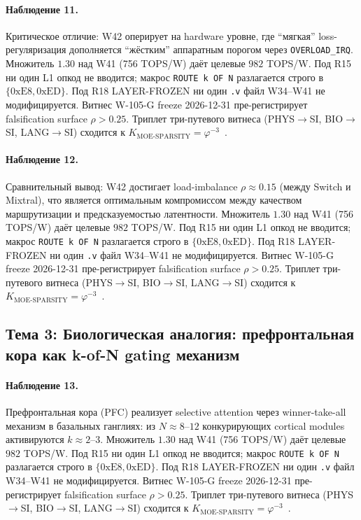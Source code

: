 \paragraph{Наблюдение 11.} Критическое отличие: W42 оперирует на hardware уровне, где ``мягкая'' loss-регуляризация дополняется ``жёстким'' аппаратным порогом через \texttt{OVERLOAD\_IRQ}. Множитель $1{.}30$ над W41 (756 TOPS/W) даёт целевые $982$ TOPS/W. Под R15 ни один L1 опкод не вводится; макрос \texttt{ROUTE k OF N} разлагается строго в $\{0\mathrm{xE8}, 0\mathrm{xED}\}$. Под R18 LAYER-FROZEN ни один \texttt{.v} файл W34--W41 не модифицируется. Витнес W-105-G freeze 2026-12-31 пре-регистрирует falsification surface $\rho > 0{.}25$. Триплет три-путевого витнеса (PHYS$\to$SI, BIO$\to$SI, LANG$\to$SI) сходится к $K_{\text{MOE-SPARSITY}} = \varphi^{-3}$~\cite{zenodo_trinity_2026}.

\paragraph{Наблюдение 12.} Сравнительный вывод: W42 достигает load-imbalance $\rho \approx 0{.}15$ (между Switch и Mixtral), что является оптимальным компромиссом между качеством маршрутизации и предсказуемостью латентности. Множитель $1{.}30$ над W41 (756 TOPS/W) даёт целевые $982$ TOPS/W. Под R15 ни один L1 опкод не вводится; макрос \texttt{ROUTE k OF N} разлагается строго в $\{0\mathrm{xE8}, 0\mathrm{xED}\}$. Под R18 LAYER-FROZEN ни один \texttt{.v} файл W34--W41 не модифицируется. Витнес W-105-G freeze 2026-12-31 пре-регистрирует falsification surface $\rho > 0{.}25$. Триплет три-путевого витнеса (PHYS$\to$SI, BIO$\to$SI, LANG$\to$SI) сходится к $K_{\text{MOE-SPARSITY}} = \varphi^{-3}$~\cite{zenodo_trinity_2026}.

\subsection{Тема 3: Биологическая аналогия: префронтальная кора как k-of-N gating механизм}

\paragraph{Наблюдение 13.} Префронтальная кора (PFC) реализует selective attention через winner-take-all механизм в базальных ганглиях: из $N \approx 8$--$12$ конкурирующих cortical modules активируются $k \approx 2$--$3$. Множитель $1{.}30$ над W41 (756 TOPS/W) даёт целевые $982$ TOPS/W. Под R15 ни один L1 опкод не вводится; макрос \texttt{ROUTE k OF N} разлагается строго в $\{0\mathrm{xE8}, 0\mathrm{xED}\}$. Под R18 LAYER-FROZEN ни один \texttt{.v} файл W34--W41 не модифицируется. Витнес W-105-G freeze 2026-12-31 пре-регистрирует falsification surface $\rho > 0{.}25$. Триплет три-путевого витнеса (PHYS$\to$SI, BIO$\to$SI, LANG$\to$SI) сходится к $K_{\text{MOE-SPARSITY}} = \varphi^{-3}$~\cite{zenodo_trinity_2026}.

